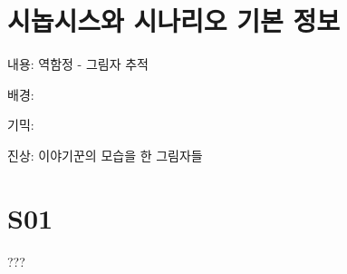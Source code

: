 \documentclass{report}
\begin{document}
	\section{시놉시스와 시나리오 기본 정보}
		내용: 역함정 - 그림자 추적
		
		배경: 
		
		기믹: 
		
		진상: 이야기꾼의 모습을 한 그림자들
	
	\section{S01}
		???
\end{document}
